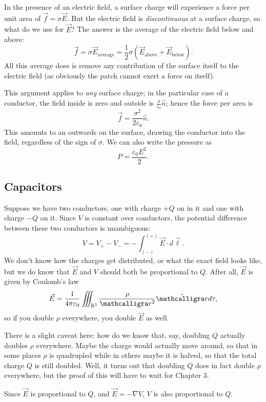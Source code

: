 In the presence of an electric field, a surface charge will experience a force per unit area of $\vec{f}=\sigma\vec{E}$. But the electric field is \textit{discontinuous} at a surface charge, so what do we use for $\vec{E}$? The answer is the average of the electric field below and above:
\[\vec{f}=\sigma\vec{E}_{\text{average}}=\frac{1}{2}\sigma(\vec{E}_{\text{above}}+\vec{E}_{\text{below}}).\]
All this average does is remove any contribution of the surface itself to the electric field (as obviously the patch cannot exert a force on itself).

This argument applies to \textit{any} surface charge; in the particular case of a conductor, the field inside is zero and outside is $\frac{\sigma}{\varepsilon_0}\hat{n}$; hence the force per area is
\[\vec{f}=\frac{\sigma^2}{2\varepsilon_0}\hat{n}.\]
This amounts to an outwards  on the surface, drawing the conductor into the field, regardless of the sign of $\sigma$. We can also write the pressure as
\[P=\frac{\varepsilon_0 E^2}{2}.\]

\subsection{Capacitors}

Suppose we have two conductors, one with charge $+Q$ on in it and one with charge $-Q$ on it. Since $V$ is constant over conductors, the potential difference between these two conductors is unambiguous:
\[V=V_+-V_-=-\int_{(-)}^{(+)}\vec{E}\cdot d\vec{\ell}.\]
We don't know how the charges get distributed, or what the exact field looks like, but we do know that $\vec{E}$ and $V$ should both be proportional to $Q$. After all, $\vec{E}$ is given by Coulomb's law
\[\vec{E}=\frac{1}{4\pi\varepsilon_0}\iiint_{\mathbb{R}^3}\frac{\rho}{\scr^2}\hat{\scr}d\tau,\]
so if you double $\rho$ everywhere, you double $\vec{E}$ as well. 

\begin{remark}
There is a slight caveat here: how do we know that, say, doubling $Q$ actually doubles $\rho$ everywhere. Maybe the charge would actually move around, so that in some places $\rho$ is quadrupled while in others maybe it is halved, so that the total charge $Q$ is still doubled. Well, it turns out that doubling $Q$ does in fact double $\rho$ everywhere, but the proof of this will have to wait for Chapter 3.
\end{remark}

Since $\vec{E}$ is proportional to $Q$, and $\vec{E}=-\nabla V$, $V$ is also proportional to $Q$. 

